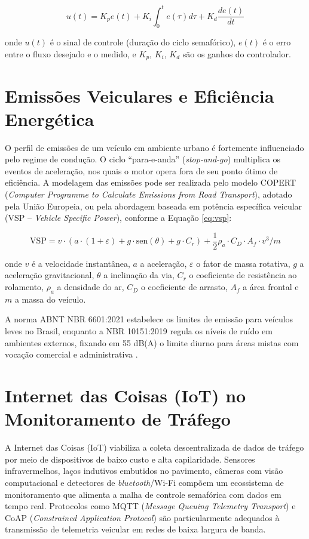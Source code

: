 \documentclass[12pt,a4paper,oneside]{abntex2}
\begin{document}
\begin{equation}
u(t) = K_p e(t) + K_i \int_0^t e(\tau) d\tau + K_d \frac{de(t)}{dt}
\label{eq:pid}
\end{equation}

onde $u(t)$ é o sinal de controle (duração do ciclo semafórico), $e(t)$ é o erro entre o fluxo desejado e o medido, e $K_p$, $K_i$, $K_d$ são os ganhos do controlador.

\section{Emissões Veiculares e Eficiência Energética}

O perfil de emissões de um veículo em ambiente urbano é fortemente influenciado pelo regime de condução. O ciclo ``para-e-anda'' (\textit{stop-and-go}) multiplica os eventos de aceleração, nos quais o motor opera fora de seu ponto ótimo de eficiência. A modelagem das emissões pode ser realizada pelo modelo COPERT (\textit{Computer Programme to Calculate Emissions from Road Transport}), adotado pela União Europeia, ou pela abordagem baseada em potência específica veicular (VSP -- \textit{Vehicle Specific Power}), conforme a Equação \ref{eq:vsp}:

\begin{equation}
\text{VSP} = v \cdot (a \cdot (1 + \varepsilon) + g \cdot \text{sen}(\theta) + g \cdot C_r) + \frac{1}{2} \rho_a \cdot C_D \cdot A_f \cdot v^3 / m
\label{eq:vsp}
\end{equation}

onde $v$ é a velocidade instantânea, $a$ a aceleração, $\varepsilon$ o fator de massa rotativa, $g$ a aceleração gravitacional, $\theta$ a inclinação da via, $C_r$ o coeficiente de resistência ao rolamento, $\rho_a$ a densidade do ar, $C_D$ o coeficiente de arrasto, $A_f$ a área frontal e $m$ a massa do veículo.

A norma ABNT NBR 6601:2021 estabelece os limites de emissão para veículos leves no Brasil, enquanto a NBR 10151:2019 regula os níveis de ruído em ambientes externos, fixando em 55 dB(A) o limite diurno para áreas mistas com vocação comercial e administrativa \cite{ABNT10151}.

\section{Internet das Coisas (IoT) no Monitoramento de Tráfego}

A Internet das Coisas (IoT) viabiliza a coleta descentralizada de dados de tráfego por meio de dispositivos de baixo custo e alta capilaridade. Sensores infravermelhos, laços indutivos embutidos no pavimento, câmeras com visão computacional e detectores de \textit{bluetooth}/Wi-Fi compõem um ecossistema de monitoramento que alimenta a malha de controle semafórica com dados em tempo real. Protocolos como MQTT (\textit{Message Queuing Telemetry Transport}) e CoAP (\textit{Constrained Application Protocol}) são particularmente adequados à transmissão de telemetria veicular em redes de baixa largura de banda.
\end{document}
